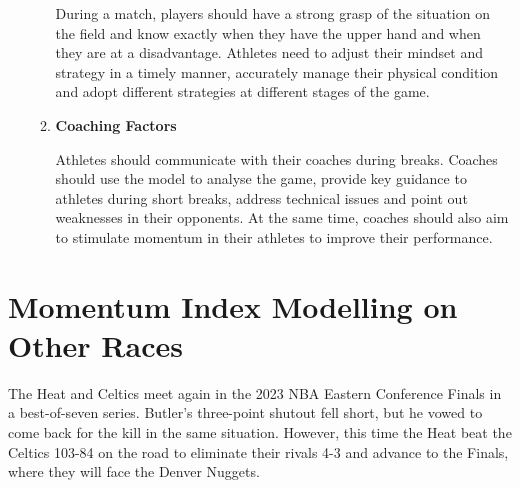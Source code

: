 \documentclass[12pt]{article}  %
\begin{document}
\begin{itemize}
\begin{enumerate}[label=\alph*.]
        During a match, players should have a strong grasp of the situation on the field and know exactly when they have the upper hand and when they are at a disadvantage. Athletes need to adjust their mindset and strategy in a timely manner, accurately manage their physical condition and adopt different strategies at different stages of the game.
		
		\item \textbf{Coaching Factors}
		
		Athletes should communicate with their coaches during breaks. Coaches should use the model to analyse the game, provide key guidance to athletes during short breaks, address technical issues and point out weaknesses in their opponents. At the same time, coaches should also aim to stimulate momentum in their athletes to improve their performance.
	\end{enumerate}
\end{itemize}

\section{Momentum Index Modelling on Other Races}

The Heat and Celtics meet again in the 2023 NBA Eastern Conference Finals in a best-of-seven series. Butler's three-point shutout fell short, but he vowed to come back for the kill in the same situation. However, this time the Heat beat the Celtics 103-84 on the road to eliminate their rivals 4-3 and advance to the Finals, where they will face the Denver Nuggets.
\end{document}
